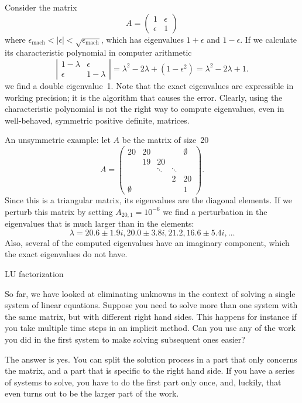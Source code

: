 Consider the matrix 
\[ A=
\begin{pmatrix}
1&\epsilon\\ \epsilon&1  
\end{pmatrix}
\]
where $\epsilon_{\mathrm{mach}}<|\epsilon|<\sqrt{\epsilon_{\mathrm{mach}}}$,
which has eigenvalues $1+\epsilon$ and $1-\epsilon$.
If we calculate its characteristic polynomial in computer arithmetic
\[ \left|
  \begin{matrix}
    1-\lambda&\epsilon\\ \epsilon&1-\lambda
  \end{matrix}\right| = \lambda^2-2\lambda+(1-\epsilon^2)=
  \lambda^2-2\lambda+1.
\]
we find a
double eigenvalue~1. Note that the exact eigenvalues are
expressible in working precision; it is the algorithm that causes
the error. Clearly, using the characteristic polynomial is not the
right way to compute eigenvalues, even in well-behaved, symmetric
positive definite, matrices.

An unsymmetric example: let $A$ be the matrix of size~20
\[ A=
\begin{pmatrix}
  20&20&      &      &\emptyset\\
    &19&20\\
    &  &\ddots&\ddots\\
    &  &      &2     &20\\
  \emptyset&  &      &      &1
\end{pmatrix}.
\]
Since this is a triangular matrix, its eigenvalues are the diagonal
elements. If we perturb this matrix by setting $A_{20,1}=10^{-6}$ we
find a perturbation in the eigenvalues that is much larger than in the
elements:
\[ \lambda=20.6\pm 1.9i, 20.0\pm 3.8i, 21.2,16.6\pm 5.4i,\ldots \]
Also, several of the computed eigenvalues have an imaginary component,
which the exact eigenvalues do not have.

 {LU factorization}

So far, we have looked at eliminating unknowns in the context of
solving a single system of linear equations.  Suppose you need to
solve more than one system with the same matrix, but with different
right hand sides. This happens for instance if you take multiple time
steps in an implicit method. Can you use any of the work you did in
the first system to make solving subsequent ones easier?

The answer is yes. You can split the solution process in a part that
only concerns the matrix, and a part that is specific to the right hand
side. If you have a series of systems to solve, you have to do the
first part only once, and, luckily, that even turns out to be the
larger part of the work.

